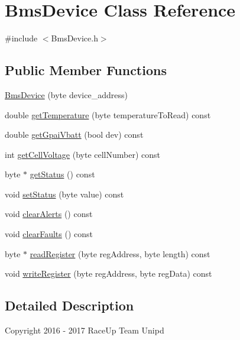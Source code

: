 \hypertarget{class_bms_device}{}\section{Bms\+Device Class Reference}
\label{class_bms_device}


{\ttfamily \#include $<$Bms\+Device.\+h$>$}

\subsection*{Public Member Functions}
\begin{DoxyCompactItemize}
\item 
\hyperlink{class_bms_device_aba102aa7de2c504017d67bc6c24dae39}{Bms\+Device} (byte device\+\_\+address)
\item 
double \hyperlink{class_bms_device_ac61154d9b8cc11061dcc7d0243ed955f}{get\+Temperature} (byte temperature\+To\+Read) const 
\item 
double \hyperlink{class_bms_device_a8b11a6a96bc0634e14bb7847b448bab6}{get\+Gpai\+Vbatt} (bool dev) const 
\item 
int \hyperlink{class_bms_device_a0bdebab046f8337914ba88fdd20da1bd}{get\+Cell\+Voltage} (byte cell\+Number) const 
\item 
byte $\ast$ \hyperlink{class_bms_device_ad72700d4da6cc7d6ef52e76091ab9d9a}{get\+Status} () const 
\item 
void \hyperlink{class_bms_device_af711c0fbff46642d525c63a668cb7a2d}{set\+Status} (byte value) const 
\item 
void \hyperlink{class_bms_device_a99aeb3676c9732e8a22d8561b5dde254}{clear\+Alerts} () const 
\item 
void \hyperlink{class_bms_device_a20e255789e1b0d8d16059c8ab1ac32dd}{clear\+Faults} () const 
\item 
byte $\ast$ \hyperlink{class_bms_device_ae21dd2360edf7b3f21e2086315ddecfb}{read\+Register} (byte reg\+Address, byte length) const 
\item 
void \hyperlink{class_bms_device_a7c37cd79623465ddee0f1b4d6be0e86c}{write\+Register} (byte reg\+Address, byte reg\+Data) const 
\end{DoxyCompactItemize}


\subsection{Detailed Description}
Copyright 2016 -\/ 2017 Race\+Up Team Unipd

